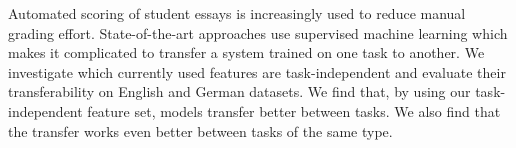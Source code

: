 Automated scoring of student essays is increasingly used to reduce manual grading effort. State-of-the-art approaches use supervised machine learning which makes it complicated to transfer a system trained on one task to another. We investigate which currently used features are task-independent and evaluate their transferability on English and German datasets. We find that, by using our task-independent feature set, models transfer better between tasks. We also find that the transfer works even better between tasks of the same type.
